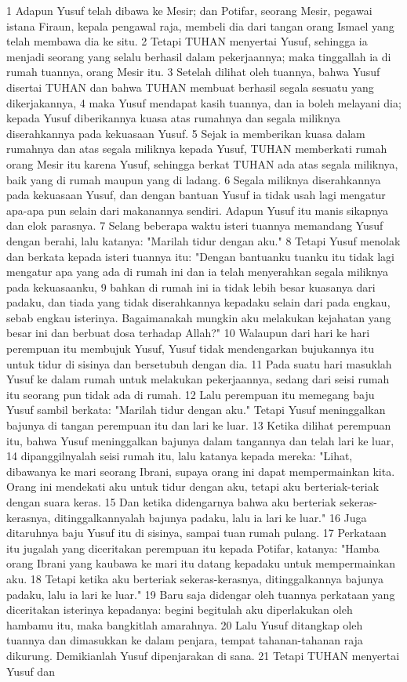 \begin{biblechapter} %
1 Adapun Yusuf telah dibawa ke Mesir; dan Potifar, seorang Mesir, pegawai istana Firaun, kepala pengawal raja, membeli dia dari tangan orang Ismael yang telah membawa dia ke situ. 2 Tetapi TUHAN menyertai Yusuf, sehingga ia menjadi seorang yang selalu berhasil dalam pekerjaannya; maka tinggallah ia di rumah tuannya, orang Mesir itu. 3 Setelah dilihat oleh tuannya, bahwa Yusuf disertai TUHAN dan bahwa TUHAN membuat berhasil segala sesuatu yang dikerjakannya, 4 maka Yusuf mendapat kasih tuannya, dan ia boleh melayani dia; kepada Yusuf diberikannya kuasa atas rumahnya dan segala miliknya diserahkannya pada kekuasaan Yusuf. 5 Sejak ia memberikan kuasa dalam rumahnya dan atas segala miliknya kepada Yusuf, TUHAN memberkati rumah orang Mesir itu karena Yusuf, sehingga berkat TUHAN ada atas segala miliknya, baik yang di rumah maupun yang di ladang. 6 Segala miliknya diserahkannya pada kekuasaan Yusuf, dan dengan bantuan Yusuf ia tidak usah lagi mengatur apa-apa pun selain dari makanannya sendiri. Adapun Yusuf itu manis sikapnya dan elok parasnya. 7 Selang beberapa waktu isteri tuannya memandang Yusuf dengan berahi, lalu katanya: "Marilah tidur dengan aku." 8 Tetapi Yusuf menolak dan berkata kepada isteri tuannya itu: "Dengan bantuanku tuanku itu tidak lagi mengatur apa yang ada di rumah ini dan ia telah menyerahkan segala miliknya pada kekuasaanku, 9 bahkan di rumah ini ia tidak lebih besar kuasanya dari padaku, dan tiada yang tidak diserahkannya kepadaku selain dari pada engkau, sebab engkau isterinya. Bagaimanakah mungkin aku melakukan kejahatan yang besar ini dan berbuat dosa terhadap Allah?" 10 Walaupun dari hari ke hari perempuan itu membujuk Yusuf, Yusuf tidak mendengarkan bujukannya itu untuk tidur di sisinya dan bersetubuh dengan dia. 11 Pada suatu hari masuklah Yusuf ke dalam rumah untuk melakukan pekerjaannya, sedang dari seisi rumah itu seorang pun tidak ada di rumah. 12 Lalu perempuan itu memegang baju Yusuf sambil berkata: "Marilah tidur dengan aku." Tetapi Yusuf meninggalkan bajunya di tangan perempuan itu dan lari ke luar. 13 Ketika dilihat perempuan itu, bahwa Yusuf meninggalkan bajunya dalam tangannya dan telah lari ke luar, 14 dipanggilnyalah seisi rumah itu, lalu katanya kepada mereka: "Lihat, dibawanya ke mari seorang Ibrani, supaya orang ini dapat mempermainkan kita. Orang ini mendekati aku untuk tidur dengan aku, tetapi aku berteriak-teriak dengan suara keras. 15 Dan ketika didengarnya bahwa aku berteriak sekeras-kerasnya, ditinggalkannyalah bajunya padaku, lalu ia lari ke luar." 16 Juga ditaruhnya baju Yusuf itu di sisinya, sampai tuan rumah pulang. 17 Perkataan itu jugalah yang diceritakan perempuan itu kepada Potifar, katanya: "Hamba orang Ibrani yang kaubawa ke mari itu datang kepadaku untuk mempermainkan aku. 18 Tetapi ketika aku berteriak sekeras-kerasnya, ditinggalkannya bajunya padaku, lalu ia lari ke luar." 19 Baru saja didengar oleh tuannya perkataan yang diceritakan isterinya kepadanya: begini begitulah aku diperlakukan oleh hambamu itu, maka bangkitlah amarahnya. 20 Lalu Yusuf ditangkap oleh tuannya dan dimasukkan ke dalam penjara, tempat tahanan-tahanan raja dikurung. Demikianlah Yusuf dipenjarakan di sana. 21 Tetapi TUHAN menyertai Yusuf dan 
\end{biblechapter}

